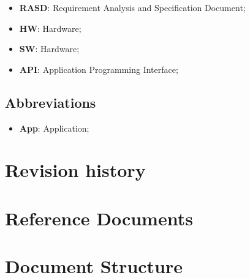\begin{comment}


\item \textbf{Delayed ticket}: a ticket is delayed when, after the its ticket call, the user is not submit the QRCode in time (threshold of 1-2 minutes);
\item \textbf{Cancelled ticket}: a ticket is cancelled when it's already delayed and passed too much time (threshold of 15-20 minutes);
\item \textbf{BookingID}: string of n alphanumerical characters that is represented by the QRCode. If the user is not registered [...];


\end{comment}
\begin{itemize}
\subsection{Acronyms}
\item \textbf{RASD}: Requirement Analysis and Specification Document;
\item \textbf{HW}: Hardware;
\item \textbf{SW}: Hardware;
\item \textbf{API}: Application Programming Interface;
\end{itemize}


\subsection{Abbreviations}
\begin{itemize}
\item \textbf{App}: Application;
\end{itemize}

\section{Revision history}

\section{Reference Documents}

\section{Document Structure}

